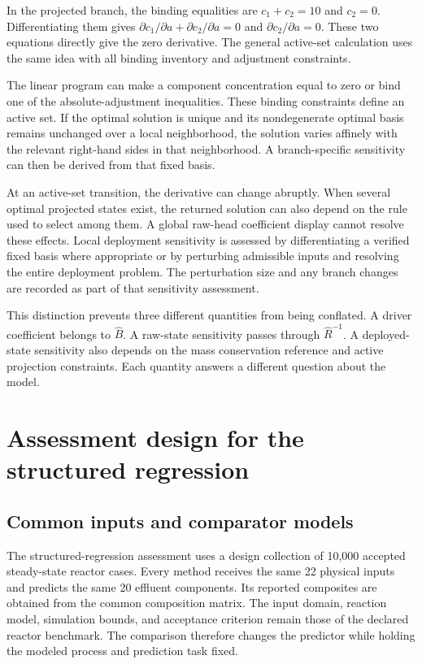 In the projected branch, the binding equalities are \(c_1+c_2=10\) and \(c_2=0\). Differentiating them gives \(\partial c_1/\partial a+\partial c_2/\partial a=0\) and \(\partial c_2/\partial a=0\). These two equations directly give the zero derivative. The general active-set calculation uses the same idea with all binding inventory and adjustment constraints.

The linear program can make a component concentration equal to zero or bind one of the absolute-adjustment inequalities. These binding constraints define an active set. If the optimal solution is unique and its nondegenerate optimal basis remains unchanged over a local neighborhood, the solution varies affinely with the relevant right-hand sides in that neighborhood. A branch-specific sensitivity can then be derived from that fixed basis.

At an active-set transition, the derivative can change abruptly. When several optimal projected states exist, the returned solution can also depend on the rule used to select among them. A global raw-head coefficient display cannot resolve these effects. Local deployment sensitivity is assessed by differentiating a verified fixed basis where appropriate or by perturbing admissible inputs and resolving the entire deployment problem. The perturbation size and any branch changes are recorded as part of that sensitivity assessment.

This distinction prevents three different quantities from being conflated. A driver coefficient belongs to \(\widehat B\). A raw-state sensitivity passes through \(\widehat R^{-1}\). A deployed-state sensitivity also depends on the mass conservation reference and active projection constraints. Each quantity answers a different question about the model.

\section{Assessment design for the structured regression}

\subsection{Common inputs and comparator models}

The structured-regression assessment uses a design collection of 10,000 accepted steady-state reactor cases. Every method receives the same 22 physical inputs and predicts the same 20 effluent components. Its reported composites are obtained from the common composition matrix. The input domain, reaction model, simulation bounds, and acceptance criterion remain those of the declared reactor benchmark. The comparison therefore changes the predictor while holding the modeled process and prediction task fixed.

